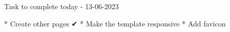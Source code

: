 Task to complete today - 13-06-2023

* Create other pages ✔
* Make the template responsive
* Add favicon